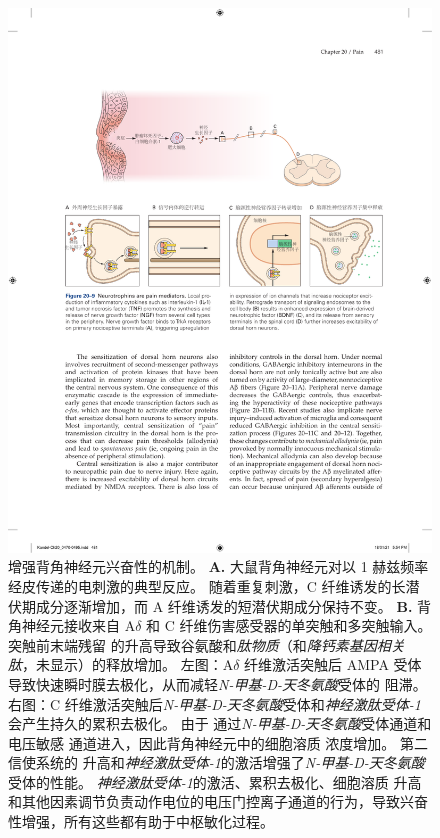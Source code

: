 \begin{figure}[htbp]
	\centering
	\includegraphics[width=1.0\linewidth]{chap20/fig_20_9}
	\caption{增强背角神经元兴奋性的机制。
		\textbf{A.} 大鼠背角神经元对以 1 赫兹频率经皮传递的电刺激的典型反应。
		随着重复刺激，C 纤维诱发的长潜伏期成分逐渐增加，而 A 纤维诱发的短潜伏期成分保持不变。
		\textbf{B.} 背角神经元接收来自 A$\delta$ 和 C 纤维伤害感受器的单突触和多突触输入。
		突触前末端残留  的升高导致谷氨酸和\textit{肽物质}（和\textit{降钙素基因相关肽}，未显示）的释放增加。
		左图：A$\delta$ 纤维激活突触后 AMPA 受体导致快速瞬时膜去极化，从而减轻\textit{N-甲基-D-天冬氨酸}受体的  阻滞。
		右图：C 纤维激活突触后\textit{N-甲基-D-天冬氨酸}受体和\textit{神经激肽受体-1}会产生持久的累积去极化。
		由于  通过\textit{N-甲基-D-天冬氨酸}受体通道和电压敏感  通道进入，因此背角神经元中的细胞溶质  浓度增加。
		第二信使系统的  升高和\textit{神经激肽受体-1}的激活增强了\textit{N-甲基-D-天冬氨酸}受体的性能。
		\textit{神经激肽受体-1}的激活、累积去极化、细胞溶质  升高和其他因素调节负责动作电位的电压门控离子通道的行为，导致兴奋性增强，所有这些都有助于中枢敏化过程。}
	\label{fig:20_10}
\end{figure}


